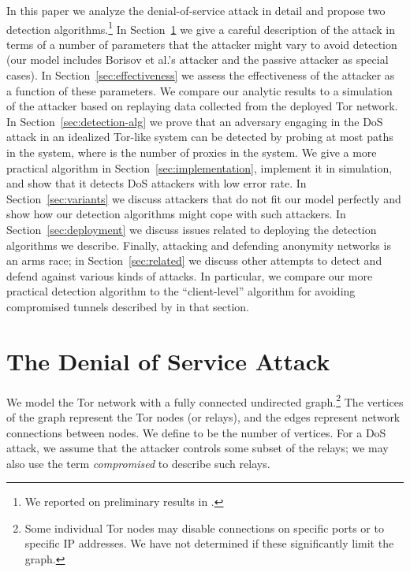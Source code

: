 \documentclass[]{lmcs}
\let\citeN\citet
\begin{document}
In this paper we analyze the denial-of-service attack in detail and
propose two detection algorithms.\footnote{We reported on preliminary
results in \cite{ddos-fc09}.}  
In Section~\ref{sec:borisov-attack}
we give a careful description of the attack in terms of a number
of parameters that the attacker might vary to avoid detection
(our model includes Borisov et al.'s attacker and the passive attacker
as special cases).  In Section~\ref{sec:effectiveness}
we assess the effectiveness of the
attacker as a function of these parameters.  We compare our analytic
results to a simulation of the attacker based on replaying data collected
from the deployed Tor network.
In Section~\ref{sec:detection-alg} we prove that an adversary engaging
in the DoS attack in an idealized Tor-like system can be detected by
probing at most  paths in the system, where  is the number of proxies
in the system.
We give a more practical algorithm in
Section~\ref{sec:implementation}, implement it in simulation,
and show that it detects DoS attackers with low error rate.
In Section~\ref{sec:variants} we
discuss attackers that do not fit our model perfectly and show how
our detection algorithms might cope with such attackers.
In Section~\ref{sec:deployment} we discuss issues related to
deploying the detection algorithms we describe.
Finally, attacking and defending anonymity networks is an arms race;
in Section~\ref{sec:related} we discuss other attempts to detect and
defend against various kinds of attacks.  In particular, we
compare our more practical detection algorithm to the
``client-level'' algorithm for avoiding compromised tunnels
described by \citeN{das-borisov:securing-tor-tunnels} in that section.


\section{The Denial of Service Attack}
\label{sec:borisov-attack}

We model the Tor network with a fully connected undirected graph.\footnote{Some
individual Tor nodes may disable connections on specific ports or to
specific IP addresses.  We have not determined if these
significantly limit the graph.}
The vertices of the graph represent the Tor nodes (or relays), 
and the edges represent
network connections between nodes. 
We define  to be the number of vertices.
For a DoS attack, we assume that the attacker controls some subset of
the relays; we may also use the term \emph{compromised} to describe
such relays.
\end{document}
